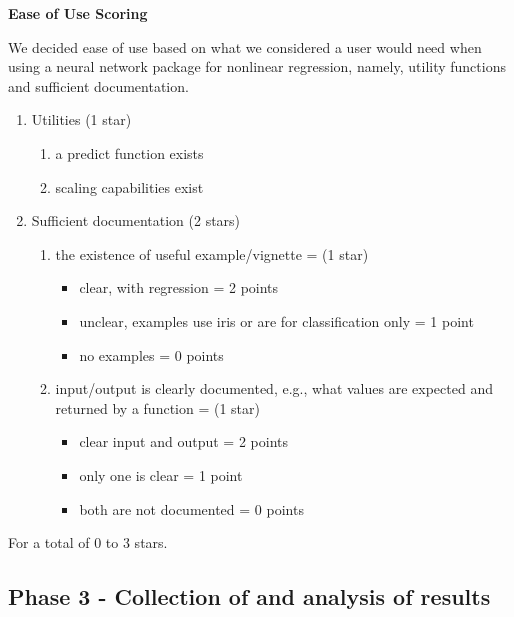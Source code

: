 \textbf{Ease of Use Scoring}

We decided ease of use based on what we considered a user would need
when using a neural network package for nonlinear regression, namely,
utility functions and sufficient documentation.

\begin{enumerate}
\def\labelenumi{(\arabic{enumi})}
\tightlist
\item
  Utilities (1 star)

  \begin{enumerate}
  \def\labelenumii{(\alph{enumii})}
  \tightlist
  \item
    a predict function exists\\
  \item
    scaling capabilities exist
  \end{enumerate}
\item
  Sufficient documentation (2 stars)

  \begin{enumerate}
  \def\labelenumii{(\alph{enumii})}
  \tightlist
  \item
    the existence of useful example/vignette = (1 star)

    \begin{itemize}
    \tightlist
    \item
      clear, with regression = 2 points
    \item
      unclear, examples use iris or are for classification only = 1
      point
    \item
      no examples = 0 points
    \end{itemize}
  \item
    input/output is clearly documented, e.g., what values are expected
    and returned by a function = (1 star)

    \begin{itemize}
    \tightlist
    \item
      clear input and output = 2 points
    \item
      only one is clear = 1 point
    \item
      both are not documented = 0 points
    \end{itemize}
  \end{enumerate}
\end{enumerate}

For a total of 0 to 3 stars.

\hypertarget{phase-3---collection-of-and-analysis-of-results}{%
\subsection{Phase 3 - Collection of and analysis of
results}\label{phase-3---collection-of-and-analysis-of-results}}

